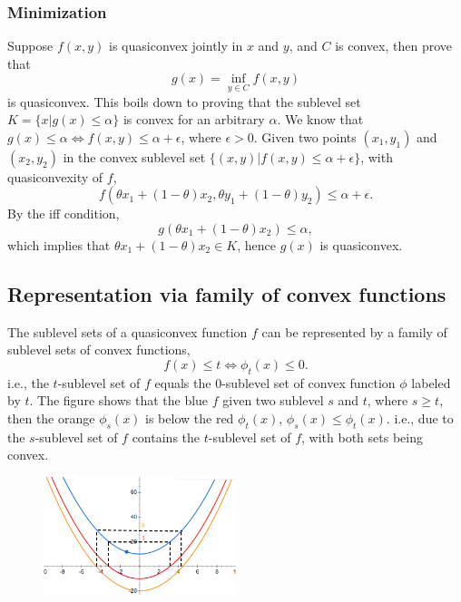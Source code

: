 \subsubsection{Minimization}
Suppose $f(x,y)$ is quasiconvex jointly in $x$ and $y$, and $C$ is convex, then prove that
\begin{equation}
   g(x)= \inf_{y \in C} f(x,y)
\end{equation}
is quasiconvex.
This boils down to proving that the sublevel set $K= \{ x | g(x) \le \alpha \}$ is convex for an arbitrary $\alpha$.
We know that $g(x) \le \alpha \Leftrightarrow f(x,y) \le \alpha + \epsilon$, where $\epsilon > 0$.
Given two points $(x_1,y_1)$ and $(x_2,y_2)$ in the convex sublevel set $\{(x,y) | f(x,y) \le \alpha + \epsilon \}$, with quasiconvexity of $f$,
\begin{equation}
   f(\theta x_1 + (1-\theta)x_2, \theta y_1+ (1-\theta) y_2) \le \alpha + \epsilon.
\end{equation}
By the iff condition,
\begin{equation}
   g(\theta x_1 + (1-\theta)x_2) \le \alpha,
\end{equation}
which implies that $\theta x_1 + (1-\theta)x_2 \in K$, hence $g(x)$ is quasiconvex.

\subsection{Representation via family of convex functions}
The sublevel sets of a quasiconvex function $f$ can be represented by a family of sublevel sets of convex functions,
\begin{equation}
   f(x) \le t \Leftrightarrow \phi_t(x) \le 0.
\end{equation}
i.e., the $t$-sublevel set of $f$ equals the $0$-sublevel set of convex function $\phi$ labeled by $t$.
The figure shows that the blue $f$ given two sublevel $s$ and $t$, where $s\ge t$, then the orange $\phi_s(x)$ is below the red $\phi_t(x)$, $\phi_s(x) \le \phi_t(x)$. 
i.e., due to the $s$-sublevel set of $f$ contains the $t$-sublevel set of $f$, with both sets being convex.
\begin{figure}[H]
   \includegraphics[width=0.5\textwidth]{representation_family_convex_function}
\end{figure}

